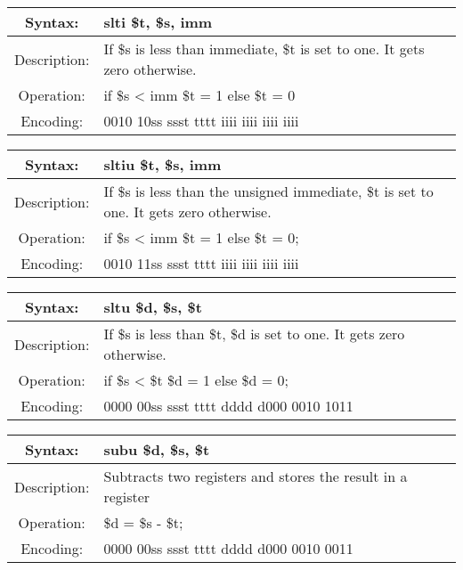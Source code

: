     \begin{table}[!hbp]
    \begin{tabularx}{\textwidth}{|c|X|}
        \hline
        Syntax: & slti \$t, \$s, imm \\
        \hline
        Description: & If \$s is less than immediate, \$t is set to one. It gets zero otherwise. \\
        \hline
        Operation: & if \$s < imm \$t = 1 else \$t = 0 \\
        \hline
        Encoding: & 0010 10ss ssst tttt iiii iiii iiii iiii \\
        \hline
    \end{tabularx}
    \end{table}

    \begin{table}[!hbp]
    \begin{tabularx}{\textwidth}{|c|X|}
        \hline
        Syntax: & sltiu \$t, \$s, imm \\
        \hline
        Description: & If \$s is less than the unsigned immediate, \$t is set to one. It gets zero otherwise. \\
        \hline
        Operation: & if \$s < imm \$t = 1 else \$t = 0; \\
        \hline
        Encoding: & 0010 11ss ssst tttt iiii iiii iiii iiii \\
        \hline
    \end{tabularx}
    \end{table}
    
    \begin{table}[!hbp]
    \begin{tabularx}{\textwidth}{|c|X|}
        \hline
        Syntax: & sltu \$d, \$s, \$t \\
        \hline
        Description: & If \$s is less than \$t, \$d is set to one. It gets zero otherwise. \\
        \hline
        Operation: & if \$s < \$t \$d = 1 else \$d = 0; \\
        \hline
        Encoding: & 0000 00ss ssst tttt dddd d000 0010 1011 \\
        \hline
    \end{tabularx}
    \end{table}

    \begin{table}[!hbp]
    \begin{tabularx}{\textwidth}{|c|X|}
        \hline
        Syntax: & subu \$d, \$s, \$t \\
        \hline
        Description: & Subtracts two registers and stores the result in a register \\
        \hline
        Operation: & \$d = \$s - \$t; \\
        \hline
        Encoding: & 0000 00ss ssst tttt dddd d000 0010 0011 \\
        \hline
    \end{tabularx}
    \end{table}

